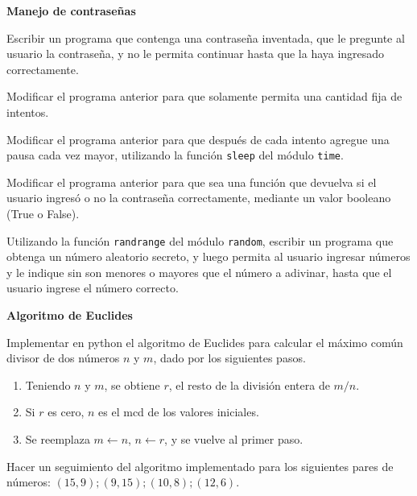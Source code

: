 \begin{ejercicio}
{\bf Manejo de contraseñas}
\begin{partes}
    \item Escribir un programa que contenga una contraseña inventada, que le
pregunte al usuario la contraseña, y no le permita continuar hasta que la
haya ingresado correctamente.
    \item Modificar el programa anterior para que solamente permita una
cantidad fija de intentos.
    \item Modificar el programa anterior para que después de cada intento
agregue una pausa cada vez mayor, utilizando la función \verb!sleep! del
módulo \verb!time!.
    \item Modificar el programa anterior para que sea una función que devuelva
si el usuario ingresó o no la contraseña correctamente, mediante un valor
booleano (True o False).
\end{partes}
\end{ejercicio}


\begin{ejercicio}
Utilizando la función \verb!randrange! del módulo \verb!random!,
escribir un programa que obtenga un número aleatorio secreto, y luego
permita al usuario ingresar números y le indique sin son menores o mayores
que el número a adivinar, hasta que el usuario ingrese el número correcto.
\end{ejercicio}


\begin{ejercicio}
{\bf Algoritmo de Euclides}
\begin{partes}
    \item Implementar en python el algoritmo de Euclides para calcular el máximo
común divisor de dos números $n$ y $m$, dado por los siguientes pasos.
    \begin{enumerate}
        \item Teniendo $n$ y $m$, se obtiene $r$, el resto de la
división entera de $m/n$.
        \item Si $r$ es cero, $n$ es el mcd de los valores iniciales.
        \item Se reemplaza $m \leftarrow n$, $n \leftarrow r$, y se vuelve al
primer paso.
    \end{enumerate}
    \item Hacer un seguimiento del algoritmo implementado para los siguientes
pares de números: $(15,9); (9,15); (10,8); (12,6)$.
\end{partes}
\end{ejercicio}

